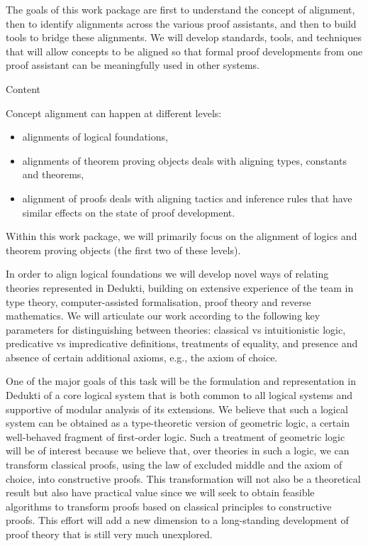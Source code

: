 The goals of this work package are first to understand the concept of
alignment, then to identify alignments across the various proof
assistants, and then to build tools to bridge these alignments. We
will develop standards, tools, and techniques that will allow concepts
to be aligned so that formal proof developments from one proof
assistant can be meaningfully used in other systems.

{\color{red} Content}

Concept alignment can happen at different levels:
\begin{itemize}
\item alignments of logical foundations,
\item alignments of theorem proving objects deals with aligning types,
  constants and theorems,
\item alignment of proofs deals with aligning tactics and
  inference rules that have similar effects on the state of proof
  development.
\end{itemize}
Within this work package, we will primarily focus on the alignment of
logics and theorem proving objects (the first two of these levels).

\newcommand{\parag}[1]{\medskip \noindent {\bf #1}} 

\parag{Aligning logical foundations}
In order to align logical foundations we will develop novel ways of
relating theories represented in Dedukti, building on extensive
experience of the team in type theory, computer-assisted
formalisation, proof theory and reverse mathematics. We will
articulate our work according to the following key parameters for
distinguishing between theories: classical vs intuitionistic logic,
predicative vs impredicative definitions, treatments of equality, and
presence and absence of certain additional axioms, e.g., the axiom of
choice.

One of the major goals of this task will be the formulation and
representation in Dedukti of a core logical system that is both common
to all logical systems and supportive of modular analysis of its
extensions. We believe that such a logical system can be obtained as a
type-theoretic version of geometric logic, a certain well-behaved
fragment of first-order logic.  Such a treatment of geometric logic
will be of interest because we
believe that, over theories in such a logic, we can transform
classical proofs, using the law of excluded middle and the axiom of
choice, into constructive proofs.  This transformation will not also be
a theoretical result but also have practical value since we 
will seek to obtain feasible algorithms to
transform proofs based on classical principles to constructive proofs.
This effort will add a new dimension to a long-standing development of
proof theory that is still very much unexplored.

